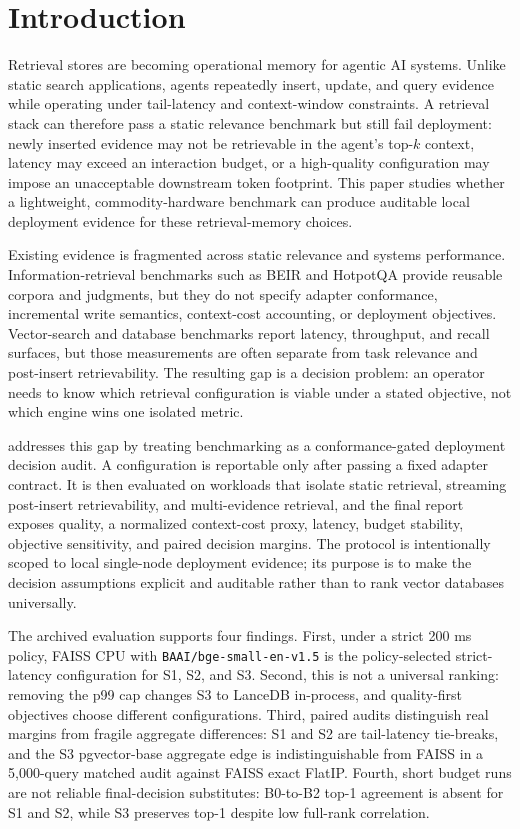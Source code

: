 \section{Introduction}

Retrieval stores are becoming operational memory for agentic AI systems. Unlike static search applications, agents repeatedly insert, update, and query evidence while operating under tail-latency and context-window constraints. A retrieval stack can therefore pass a static relevance benchmark but still fail deployment: newly inserted evidence may not be retrievable in the agent's top-$k$ context, \maxrowp latency may exceed an interaction budget, or a high-quality configuration may impose an unacceptable downstream token footprint. This paper studies whether a lightweight, commodity-hardware benchmark can produce auditable local deployment evidence for these retrieval-memory choices.

Existing evidence is fragmented across static relevance and systems performance. Information-retrieval benchmarks such as BEIR \citep{thakur2021beir} and HotpotQA \citep{yang2018hotpotqa} provide reusable corpora and judgments, but they do not specify adapter conformance, incremental write semantics, context-cost accounting, or deployment objectives. Vector-search and database benchmarks report latency, throughput, and recall surfaces, but those measurements are often separate from task relevance and post-insert retrievability. The resulting gap is a decision problem: an operator needs to know which retrieval configuration is viable under a stated objective, not which engine wins one isolated metric.

\sys addresses this gap by treating benchmarking as a conformance-gated deployment decision audit. A configuration is reportable only after passing a fixed adapter contract. It is then evaluated on workloads that isolate static retrieval, streaming post-insert retrievability, and multi-evidence retrieval, and the final report exposes quality, a normalized context-cost proxy, \maxrowp latency, budget stability, objective sensitivity, and paired decision margins. The protocol is intentionally scoped to local single-node deployment evidence; its purpose is to make the decision assumptions explicit and auditable rather than to rank vector databases universally.

The archived evaluation supports four findings. First, under a strict 200 ms \maxrowp policy, FAISS CPU with \texttt{BAAI/bge-small-en-v1.5} is the policy-selected strict-latency configuration for S1, S2, and S3. Second, this is not a universal ranking: removing the p99 cap changes S3 to LanceDB in-process, and quality-first objectives choose different configurations. Third, paired audits distinguish real margins from fragile aggregate differences: S1 and S2 are tail-latency tie-breaks, and the S3 pgvector-base aggregate edge is indistinguishable from FAISS in a 5{,}000-query matched audit against FAISS exact FlatIP. Fourth, short budget runs are not reliable final-decision substitutes: B0-to-B2 top-1 agreement is absent for S1 and S2, while S3 preserves top-1 despite low full-rank correlation.

